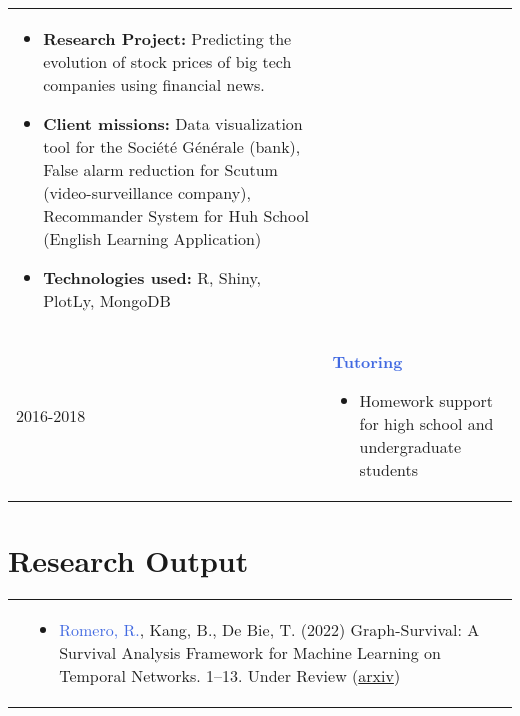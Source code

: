 \documentclass[a4paper,10pt]{article} %
\newcommand{\blue}[1]{\textcolor{royalblue}{#1}}
\begin{document}
{\begin{tabular}{p{2cm}p{15cm}}
	\begin{itemize}
		\item \textcolor{pinegreen}{\textbf{Research Project: }} Predicting the evolution of stock prices of big tech companies using financial news.
		\item \textcolor{pinegreen}{\textbf{Client missions: }} Data visualization tool for the Soci\'{e}t\'{e} G\'{e}n\'{e}rale (bank), False alarm reduction for Scutum (video-surveillance company), Recommander System for Huh School (English Learning Application)
		\item \textcolor{pinegreen}{\textbf{Technologies used: }} R, Shiny, PlotLy, MongoDB
	\end{itemize}                                                               \\

	\textsc{2016}-2018 & \textcolor{royalblue}{\textbf{Tutoring}}
	\begin{itemize}
		\item Homework support for high school and undergraduate students
	\end{itemize}
\end{tabular}

\section{Research Output}

\begin{tabular}{p{2cm}p{15cm}}
	
	 & 
	\begin{itemize}
		\item \blue{Romero, R.}, Kang, B., De Bie, T. (2022) Graph-Survival: A Survival Analysis Framework for Machine Learning on Temporal Networks. 1–13. Under Review (\href{http://arxiv.org/abs/2203.07260} {arxiv}) 

	\end{itemize}  \\
	\end{tabular}
}
\end{document}

